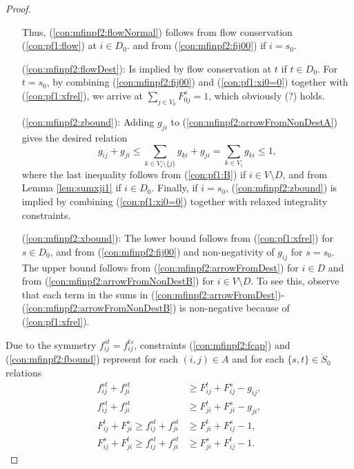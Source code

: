 \begin{proof}
\begin{itemize}[leftmargin=1cm]
	Thus, (\ref{con:mfinpf2:flowNormal}) follows from flow conservation (\ref{con:pf1:flow}) at $i\in D_0$. and from (\ref{con:mfinpf2:fij00}) if $i=s_0$.
\item[(\ref{con:mfinpf2:flowDest}):] Is implied by flow conservation at $t$  if $t\in D_0$. For $t=s_0$, by combining (\ref{con:mfinpf2:fij00}) and (\ref{con:pf1:xi0=0}) together with (\ref{con:pf1:xfrel}), we arrive at $\sum_{j\in V_0}F^s_{0j}=1$, which obviously (?) holds. 
\item[ (\ref{con:mfinpf2:zbound}):]
 	Adding $g_{ji}$ to (\ref{con:mfinpf2:arrowFromNonDestA}) gives the desired relation
	\[
	g_{ij}+g_{ji}\leq\sum_{k\in V_i\setminus\{j\}}g_{ki} +g_{ji}=\sum_{k\in V_i}g_{ki}\leq 1,
	\]
	where the last inequality follows from (\ref{con:pf1:B}) if $i\in V\setminus D$, and from Lemma \ref{lem:sumxji1} if $i\in D_0$. 
	Finally, if $i=s_0$, (\ref{con:mfinpf2:zbound}) is implied by combining (\ref{con:pf1:xi0=0}) together with relaxed integrality constraints.
\item[ (\ref{con:mfinpf2:xbound}):] The lower bound follows from (\ref{con:pf1:xfrel}) for $s\in D_0$, and from (\ref{con:mfinpf2:fij00}) and non-negativity of $g_{ij}$ for $s=s_0$.
	The upper bound follows from (\ref{con:mfinpf2:arrowFromDest}) for $i\in D$ and from (\ref{con:mfinpf2:arrowFromNonDestB}) for $i\in V\setminus D$.
	To see this, observe that each term in the sums in (\ref{con:mfinpf2:arrowFromDest})-(\ref{con:mfinpf2:arrowFromNonDestB}) is non-negative because of (\ref{con:pf1:xfrel}).
\end{itemize}
Due to the symmetry $ f^{st}_{ij} =  f^{ts}_{ij}$, constraints (\ref{con:mfinpf2:fcap}) and (\ref{con:mfinpf2:fbound}) represent for each $(i,j)\in A$ and for each $\{s,t\}\in \check{S}_0$ relations
\begin{subequations}
\begin{align}
\label{fcapa} f^{st}_{ij} +  f^{st}_{ji} &\geq F^t_{ij} + F^s_{ij}-g_{ij}, \\
\label{fcapb} f^{st}_{ij} +  f^{st}_{ji} &\geq F^t_{ji} + F^s_{ji}-g_{ji}, \\
\label{fbounda}F^t_{ij}+ F^s_{ji}\geq f^{st}_{ij} +  f^{st}_{ji} &\geq F^t_{ji} + F^s_{ij}-1, \\
\label{fboundb}F^s_{ij}+ F^t_{ji}\geq f^{st}_{ij} +  f^{st}_{ji} &\geq F^s_{ji} + F^t_{ij}-1. 

\end{align}
\end{subequations}
\end{proof}
